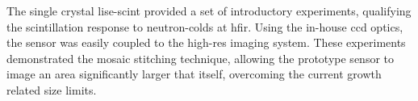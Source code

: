 \documentclass[../../../main.tex]{subfiles}%
\begin{document}
%
    \Xsubsection%
    The single crystal \gls{lise-scint} provided a set of introductory experiments, qualifying the scintillation response to \glspl{neutron-cold} at \gls{hfir}.
    Using the in-house \gls{ccd} optics, the sensor was easily coupled to the \gls{high-res} imaging system.
    These experiments demonstrated the mosaic stitching technique, allowing the prototype sensor to image an area significantly larger that itself, overcoming the current growth related size limits.
\end{document}
